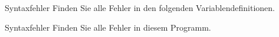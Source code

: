 \begin{task}{Syntaxfehler}
    Finden Sie alle Fehler in den folgenden Variablendefinitionen.
    
    \begin{solution}
    \end{solution}
\end{task}

\begin{task}{Syntaxfehler}
    Finden Sie alle Fehler in diesem Programm.
    
    \begin{solution}
    \end{solution}
\end{task}
